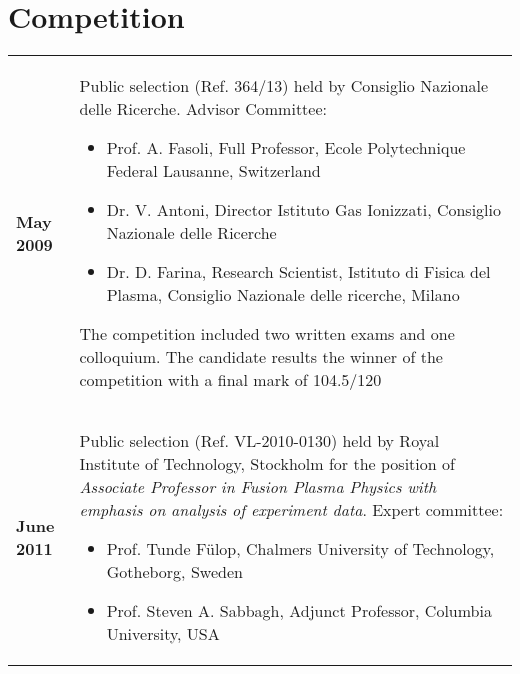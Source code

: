 \section{Competition}
\begin{tabular}{>{\bfseries}l p{15cm}}
May 2009 & Public selection (Ref. 364/13) held by Consiglio
  Nazionale delle Ricerche. Advisor Committee:
  \begin{itemize}
  \item Prof. A. Fasoli, Full Professor, Ecole Polytechnique Federal Lausanne, Switzerland
  \item Dr. V. Antoni, Director Istituto Gas Ionizzati, Consiglio Nazionale delle Ricerche
  \item Dr. D. Farina, Research Scientist, Istituto di Fisica del
    Plasma, Consiglio Nazionale delle ricerche, Milano
  \end{itemize}
  The competition included two written exams
  and one colloquium. The candidate results the winner of the
  competition with a final mark of 104.5/120 \\
June 2011 & Public selection (Ref. VL-2010-0130) held by Royal
Institute of Technology, Stockholm for the position of \emph{Associate
Professor in Fusion Plasma Physics with emphasis on analysis of
experiment data}. Expert committee:
\begin{itemize}
\item Prof. Tunde F\"ulop, Chalmers University of Technology,
  Gotheborg, Sweden 
\item Prof. Steven A. Sabbagh, Adjunct Professor, Columbia University, USA
\end{itemize} 
\end{tabular}
